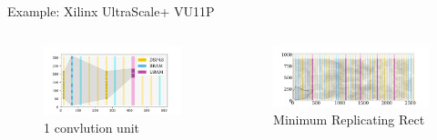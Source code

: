 \documentclass[10pt]{beamer}
\begin{document}
\begin{frame}{Example: Xilinx UltraScale+ VU11P}

  \begin{columns}[T, onlytextwidth]

    \vspace{-0.5cm}
    \begin{figure}
      \includegraphics[width=\textwidth]{img/block1}
      \caption{1 convlution unit}
    \end{figure}
    \vspace{-1cm}
    \begin{figure}
      \includegraphics[width=\textwidth]{img/block80}
      \caption{Minimum Replicating Rect}
      \label{fig:block80}
    \end{figure}


\end{columns}
\end{frame}
\end{document}
